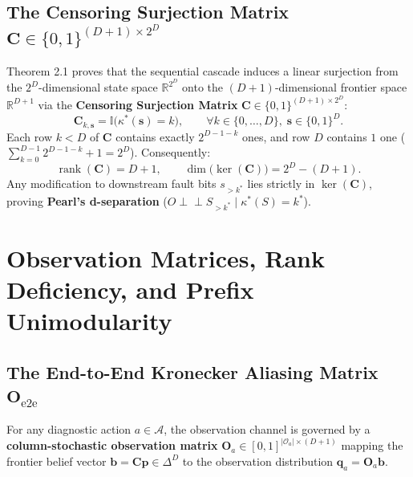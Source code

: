 \documentclass[11pt,a4paper]{article}
\theoremstyle{definition}
\theoremstyle{remark}
\begin{document}
\subsection{The Censoring Surjection Matrix $\mathbf{C} \in \{0,1\}^{(D+1) \times 2^D}$}

Theorem 2.1 proves that the sequential cascade induces a linear surjection from the $2^D$-dimensional state space $\mathbb{R}^{2^D}$ onto the $(D+1)$-dimensional frontier space $\mathbb{R}^{D+1}$ via the \textbf{Censoring Surjection Matrix} $\mathbf{C} \in \{0,1\}^{(D+1)\times 2^D}$:
\begin{equation}
    \mathbf{C}_{k, \bm{s}} = \mathbb{I}\big(\kappa^*(\bm{s}) = k\big), \qquad \forall k \in \{0, \dots, D\}, \; \bm{s} \in \{0,1\}^D.
\end{equation}
Each row $k < D$ of $\mathbf{C}$ contains exactly $2^{D-1-k}$ ones, and row $D$ contains $1$ one ($\sum_{k=0}^{D-1} 2^{D-1-k} + 1 = 2^D$). Consequently:
\begin{equation}
    \operatorname{rank}(\mathbf{C}) = D + 1, \qquad \dim\big(\ker(\mathbf{C})\big) = 2^D - (D + 1).
\end{equation}
Any modification to downstream fault bits $s_{> k^*}$ lies strictly in $\ker(\mathbf{C})$, proving \textbf{Pearl's d-separation} ($O \perp\!\!\!\perp S_{>k^*} \mid \kappa^*(S) = k^*$).

\section{Observation Matrices, Rank Deficiency, and Prefix Unimodularity}

\subsection{The End-to-End Kronecker Aliasing Matrix $\mathbf{O}_{\text{e2e}}$}

For any diagnostic action $a \in \mathcal{A}$, the observation channel is governed by a \textbf{column-stochastic observation matrix} $\mathbf{O}_a \in [0, 1]^{|\mathcal{O}_a| \times (D+1)}$ mapping the frontier belief vector $\bm{b} = \mathbf{C}\bm{p} \in \Delta^D$ to the observation distribution $\bm{q}_a = \mathbf{O}_a \bm{b}$.
\end{document}
